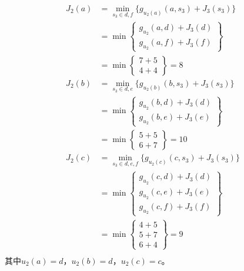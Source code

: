 \begin{example}
    \begin{equation}
        \begin{aligned}
            J_2(a) & = \min_{s_3 \in {d,f}} \{g_{u_2(a)}(a,s_3)+J_3(s_3)\}                                                                   \\
                   & =\min\left\{\begin{aligned} g_{u_2}(a,d)+ J_3(d) \\ g_{u_2}(a,f)+ J_3(f) \end{aligned} \right\}                         \\
                   & = \min\left\{\begin{aligned} 7+5 \\ 4+4 \end{aligned} \right\} =8                                                       \\
            J_2(b) & = \min_{s_3 \in {d,e}} \{g_{u_2(b)}(b,s_3)+J_3(s_3)\}                                                                   \\
                   & =\min\left\{\begin{aligned} g_{u_2}(b,d)+ J_3(d) \\ g_{u_2}(b,e)+ J_3(e) \end{aligned} \right\}                         \\
                   & = \min\left\{\begin{aligned} 5+5 \\ 6+7 \end{aligned} \right\} =10                                                      \\
            J_2(c) & = \min_{s_3 \in {d,e,f}} \{g_{u_2(c)}(c,s_3)+J_3(s_3)\}                                                                 \\
                   & =\min\left\{\begin{aligned} g_{u_2}(c,d)+ J_3(d) \\ g_{u_2}(c,e)+ J_3(e) \\ g_{u_2}(c,f)+ J_3(f) \end{aligned} \right\} \\
                   & = \min\left\{\begin{aligned} 4+5 \\ 5+7 \\ 6+4 \end{aligned} \right\} =9                                                \\
        \end{aligned}
    \end{equation}
    其中$u_2(a) = d$，$u_2(b) = d$，$u_2(c) = c$。


\end{example}
